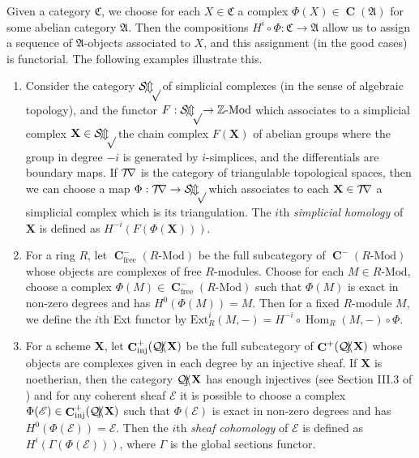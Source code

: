 \documentclass[a4paper]{article}
\theoremstyle{definition}
\theoremstyle{remark}
\newcommand{\Mod}{\ensuremath{\text{-Mod}}}
\DeclareMathOperator{\Hom}{\text{Hom}}
\DeclareMathOperator{\Ch}{\mathbf{C}}
\DeclareMathOperator{\Qcoh}{\mathcal{Q \kern -2pt c\kern -3pt o\kern -2pt h\kern -1pt}}
\begin{document}
Given a category \(\mathfrak{C}\), we choose for each
\(X\in \mathfrak{C}\) a complex \(\Phi(X)\in\Ch(\mathfrak{A})\) for some abelian
category \(\mathfrak{A}\). Then the compositions \(H^i\circ \Phi:
\mathfrak{C}\rightarrow \mathfrak{A}\) allow us to assign a sequence of
\(\mathfrak{A}\)-objects associated to \(X\), and this assignment (in the good
cases) is functorial. The following examples illustrate this.
\begin{enumerate}
    \item Consider the category \(\mathcal{S\kern -2pt i \kern -2pt
        m \kern -2pt p\kern -2pt}\) of simplicial complexes (in the sense of
        algebraic topology), and the functor \(F:\mathcal{S\kern -2pt i \kern
        -2pt m \kern -2pt p\kern -2pt}\rightarrow \mathbb{Z}\Mod\) which
        associates to a simplicial complex \(\mathbf{X}\in \mathcal{S\kern -2pt
        i \kern -2pt m \kern -2pt p\kern -2pt} \) the chain complex
        \(F(\mathbf{X})\) of abelian groups where the group in degree \(-i\) is
        generated by \(i\)-simplices, and the differentials are boundary maps.
        If \(\mathcal{T\kern -3pt r}\) is the category of triangulable
        topological spaces, then we can choose a map \(\Phi: \mathcal{T\kern
        -3pt r}\rightarrow \mathcal{S\kern -2pt
        i \kern -2pt m \kern -2pt p\kern -2pt}\) which associates to each
        \(\mathbf{X}\in \mathcal{T\kern -3pt r}\) a simplicial complex which is
        its triangulation. The \(i\)th \textit{simplicial homology} of
        \(\mathbf{X}\) is defined as \(H^{-i}(F(\Phi(\mathbf{X})))\).

    \item For a ring \(R\), let \(\Ch^-_\text{free}(R\Mod)\) be the full
        subcategory of \(\Ch^-(R\Mod)\) whose objects are complexes of
        free \(R\)-modules. Choose for each \(M\in R\Mod\), choose a complex
        \({\Phi(M)\in \Ch^-_\text{free}(R\Mod)}\) such that \(\Phi(M)\) is exact
        in non-zero degrees and has \(H^0(\Phi(M))=M\).  Then for a fixed
        \(R\)-module \(M\), we define the \(i\)th Ext functor by
        \(\text{Ext}^i_R(M,-)=H^{-i}\circ \Hom_R(M,-)\circ \Phi\). 

    \item For a scheme \(\mathbf{X}\), let
        \(\Ch_{\text{inj}}^+(\Qcoh\mathbf{X})\) be the full subcategory of
        \(\Ch^+(\Qcoh\mathbf{X})\) whose objects are complexes given in each
        degree by an injective sheaf. If \(\mathbf{X}\) is noetherian, then the
        category \(\Qcoh\mathbf{X}\) has enough injectives (see Section III.3 of
        ) and for any coherent sheaf
        \(\mathscr{E}\) it is possible to choose a complex
        \(\Phi(\mathscr{E})\in \Ch^+_{\text{inj}}(\Qcoh\mathbf{X})\) such that
        \(\Phi(\mathscr{E})\) is exact in non-zero degrees and has
        \(H^0(\Phi(\mathscr{E}))=\mathscr{E}\).  Then the \(i\)th \textit{sheaf
        cohomology} of \(\mathscr{E}\) is defined as
        \(H^i(\Gamma(\Phi(\mathscr{E})))\), where \(\Gamma\) is the global
        sections functor.
\end{enumerate}
\end{document}
